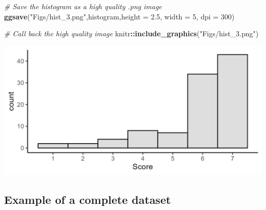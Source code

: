 \documentclass[
]{book}
\newenvironment{Shaded}{\begin{snugshade}}{\end{snugshade}}
\newcommand{\AttributeTok}[1]{\textcolor[rgb]{0.13,0.29,0.53}{#1}}
\newcommand{\CommentTok}[1]{\textcolor[rgb]{0.56,0.35,0.01}{\textit{#1}}}
\newcommand{\DecValTok}[1]{\textcolor[rgb]{0.00,0.00,0.81}{#1}}
\newcommand{\FloatTok}[1]{\textcolor[rgb]{0.00,0.00,0.81}{#1}}
\newcommand{\FunctionTok}[1]{\textcolor[rgb]{0.13,0.29,0.53}{\textbf{#1}}}
\newcommand{\NormalTok}[1]{#1}
\newcommand{\SpecialCharTok}[1]{\textcolor[rgb]{0.81,0.36,0.00}{\textbf{#1}}}
\newcommand{\StringTok}[1]{\textcolor[rgb]{0.31,0.60,0.02}{#1}}
\begin{document}
\begin{Shaded}
\begin{Highlighting}[]
\CommentTok{\# Save the histogram as a high quality .png image}
\FunctionTok{ggsave}\NormalTok{(}\StringTok{"Figs/hist\_3.png"}\NormalTok{,histogram,}\AttributeTok{height =} \FloatTok{2.5}\NormalTok{, }\AttributeTok{width =} \DecValTok{5}\NormalTok{, }\AttributeTok{dpi =} \DecValTok{300}\NormalTok{)}

\CommentTok{\# Call back the high quality image }
\NormalTok{knitr}\SpecialCharTok{::}\FunctionTok{include\_graphics}\NormalTok{(}\StringTok{"Figs/hist\_3.png"}\NormalTok{)}
\end{Highlighting}
\end{Shaded}

\includegraphics[width=20.83in]{Figs/hist_3}

\subsection*{Example of a complete dataset}\label{example-of-a-complete-dataset}
\end{document}
